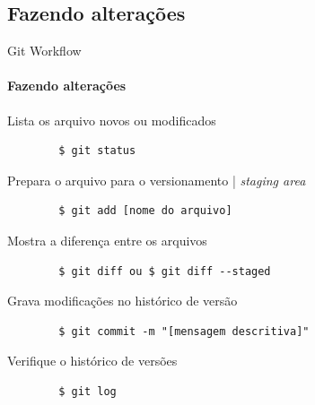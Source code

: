 \documentclass[xcolor=dvipsnames,t]{beamer}
\begin{document}
\subsection{Fazendo alterações}
\begin{frame}[fragile]{Git Workflow}
\framesubtitle{Fazendo alterações}
	\begin{block}{Lista os arquivo novos ou modificados}		
		\begin{verbatim}
		$ git status
		\end{verbatim}
	\end{block}			

	\begin{block}{Prepara o arquivo para o versionamento | \textit{staging area}}		
		\begin{verbatim}
		$ git add [nome do arquivo]
		\end{verbatim}
	\end{block}
	
	\begin{block}{Mostra a diferença entre os arquivos}		
		\begin{verbatim}
		$ git diff ou $ git diff --staged		
		\end{verbatim}
	\end{block}		

	\begin{block}{Grava modificações no histórico de versão}		
		\begin{verbatim}
		$ git commit -m "[mensagem descritiva]"
		\end{verbatim}
	\end{block}		

	\begin{block}{Verifique o histórico de versões}		
		\begin{verbatim}
		$ git log
		\end{verbatim}
	\end{block}					
\end{frame}
\end{document}
